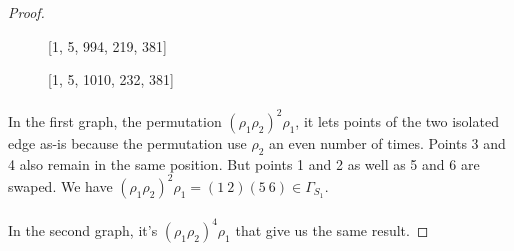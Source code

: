 \begin{proof}
\begin{figure}[H]
\begin{center}
\begin{tikzpicture}
      \end{tikzpicture}
      \caption{[1, 5, 994, 219, 381]}
    \end{center}
  \end{figure}

  \begin{figure}[H]
    \begin{center}
      \caption{[1, 5, 1010, 232, 381]}
    \end{center}
  \end{figure}

  \paragraph{}
  In the first graph, the permutation $(\rho_1 \rho_2)^2 \rho_1$, it lets points of the two isolated edge as-is because the permutation use $\rho_2$ an even number of times. Points 3 and 4 also remain in the same position. But points 1 and 2 as well as 5 and 6 are swaped. We have $(\rho_1 \rho_2)^2 \rho_1 = (1\ 2)(5\ 6) \in \Gamma_{S_1}$.

  \paragraph{}
  In the second graph, it's $(\rho_1\rho_2)^4 \rho_1$ that give us the same result.


\end{proof}
